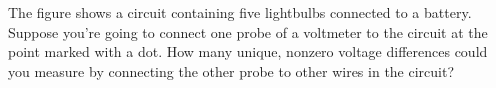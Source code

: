 The figure shows a circuit containing five lightbulbs
connected to a battery. Suppose you're going to connect one
probe of a voltmeter to the circuit at the point marked with
a dot. How many unique, nonzero voltage differences could
you measure by connecting the other probe to other
wires in the circuit?
